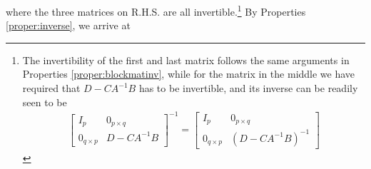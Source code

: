 where the three matrices on R.H.S. are all invertible.\footnote{The invertibility of the first and last matrix follows the same arguments in Properties \ref{proper:blockmatinv}, while for the matrix in the middle we have required that $D-CA^{-1}B$ has to be invertible, and its inverse can be readily seen to be
\begin{align*}
\begin{bmatrix}
I_p & 0_{p \times q} \\
0_{q\times p} & D - CA^{-1}B 
\end{bmatrix}^{-1}
=
\begin{bmatrix}
I_p & 0_{p \times q} \\
0_{q\times p} & (D - CA^{-1}B)^{-1}
\end{bmatrix}
\end{align*}} By Properties \ref{proper:inverse}, we arrive at
